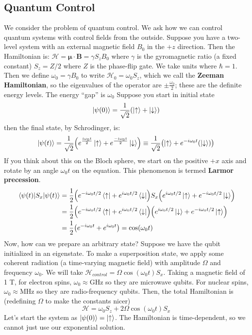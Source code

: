 \subsection{Quantum Control}
We consider the problem of quantum control. We ask how we can control quantum systems with control fields from the outside.
Suppose you have a two-level system with an external magnetic field $B_0$ in the $+z$ direction. Then the Hamiltonian is:
$\mathcal{H} = \mathbf{\mu} \cdot \mathbf{B} = \gamma S_z B_0$ where $\gamma$ is the gyromagnetic ratio (a fixed constant)
$S_z = Z/2$ where $Z$ is the phase-flip gate. We take units where $\hbar = 1$. Then we define $\omega_0 = \gamma B_0$ to write $\mathcal{H}_0 = \omega_0 S_z$, which we call the \textbf{Zeeman Hamiltonian},
so the eigenvalues of the operator are $\pm \frac{\omega_0}{2}$; these are the definite energy levels. The energy ``gap'' is $\omega_0$
Suppose you start in initial state
\[ \ket{\psi(0)} = \frac{1}{\sqrt{2}} \qty(\ket{\uparrow} + \ket{\downarrow}) \]
then the final state, by Schrodinger, is:
\[ \ket{\psi(t)} = \frac{1}{\sqrt{2}} \qty(e^{\frac{i \omega_0 t}{2}} \ket{\uparrow} + e^{\frac{-i \omega_0 t}{2}} \ket{\downarrow}) \equiv \frac{1}{\sqrt{2}} \qty(\ket{\uparrow} + e^{-i \omega_0 t} \qty(\ket{\downarrow})) \]
If you think about this on the Bloch sphere, we start on the positive $+x$ axis and rotate by an angle $\omega_0 t$ on the equation. This phenomenon is termed \textbf{Larmor precession}.
\begin{align*}
    \mel{\psi(t)}{S_x}{\psi(t)} &= \frac{1}{2} \qty(e^{-i\omega_0 t/2} \bra{\uparrow} + e^{i\omega_0 t/2} \bra{\downarrow}) S_x \qty(e^{i\omega_0 t/2} \ket{\uparrow} + e^{-i\omega_0 t/2} \ket{\downarrow}) \\
    &= \frac{1}{2} \qty(e^{-i\omega_0 t/2} \bra{\uparrow} + e^{i\omega_0 t/2} \bra{\downarrow}) \qty(e^{i\omega_0 t/2} \ket{\downarrow} + e^{-i\omega_0 t/2} \ket{\uparrow}) \\
    &= \frac{1}{2} \qty(e^{-i\omega_0 t} + e^{i \omega_0 t}) = \cos(\omega_0 t)
\end{align*}
Now, how can we prepare an arbitrary state? Suppose we have the qubit initialized in an eigenstate. To make a superposition state, we
apply some coherent radiation (a time-varying magnetic field) with amplitude $\Omega$ and frequency $\omega_0$. 
We will take $\mathcal{H}_{control} = \Omega \cos(\omega_0 t) S_x$. Taking
a magnetic field of 1 T, for electron spins, $\omega_0 \approx \textrm{GHz}$ so they are microwave qubits. For nuclear spins, $\omega_0 \approx \textrm{MHz}$ so they are radio-frequency qubits.
Then, the total Hamiltonian is (redefining $\Omega$ to make the constants nicer)
\[ \mathcal{H} = \omega_0 S_z + 2 \Omega \cos(\omega_0 t) S_x \]
Let's start the system as $\ket{\psi(0)} = \ket{\uparrow}$. The Hamiltonian is time-dependent, so we cannot
just use our exponential solution.
